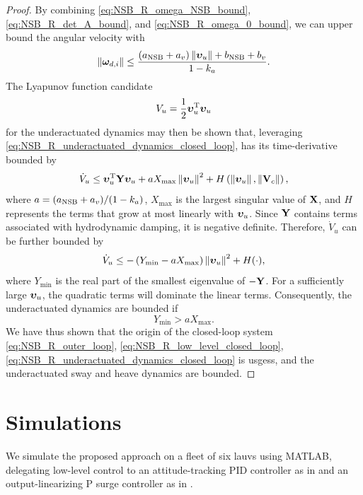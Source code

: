 \begin{proof}
    By combining \eqref{eq:NSB_R_omega_NSB_bound}, \eqref{eq:NSB_R_det_A_bound}, and \eqref{eq:NSB_R_omega_0_bound}, we can upper bound the angular velocity with 
    \begin{equation}
        \left\|\bm{\omega}_{d, i}\right\| \leq \frac{\left(a_{\rm NSB} + a_v\right)\left\|\bm{\upsilon}_u\right\| + b_{\rm NSB} + b_v}{1 - k_a} .
    \end{equation}
    The Lyapunov function candidate 
    \begin{equation}
        V_u = \frac{1}{2} \bm{\upsilon}_u^{\mathrm{T}}\bm{\upsilon}_u
    \end{equation}
    for the underactuated dynamics may then be shown that, leveraging \eqref{eq:NSB_R_underactuated_dynamics_closed_loop}, has its time-derivative bounded by 
    \begin{equation}
        \dot{V}_u \leq \bm{\upsilon}_u^{\mathrm{T}}\mathbf{Y}\bm{\upsilon}_u + aX_{\max}\left\|\bm{\upsilon}_u\right\|^2 + H\left(\left\|\bm{\upsilon}_u\right\|, \left\|\mathbf{V}_c\right\|\right),
    \end{equation}
    where $a = (a_{\rm NSB} + a_v)/(1 - k_a)$, $X_{\max}$ is the largest singular value of $\mathbf{X}$, and $H$ represents the terms that grow at most linearly with $\bm{\upsilon}_u$.
    Since $\mathbf{Y}$ contains terms associated with hydrodynamic damping, it is negative definite.
    Therefore, $\dot{V}_u$ can be further bounded by 
    \begin{equation}
        \dot{V}_u \leq -\left(Y_{\min} - aX_{\max}\right)\left\|\bm{\upsilon}_u\right\|^2 + H(\cdot),
    \end{equation}
    where $Y_{\min}$ is the real part of the smallest eigenvalue of $-\mathbf{Y}$.
    For a sufficiently large $\bm{\upsilon}_u$, the quadratic terms will dominate the linear terms.
    Consequently, the underactuated dynamics are bounded if 
    \begin{equation}
        Y_{\min} > aX_{\max}. \label{eq:NSB_R_boudedness_condition}
    \end{equation}
    We have thus shown that the origin of the closed-loop system \eqref{eq:NSB_R_outer_loop}, \eqref{eq:NSB_R_low_level_closed_loop}, \eqref{eq:NSB_R_underactuated_dynamics_closed_loop} is \glspl{usges}, and the underactuated sway and heave dynamics are bounded.
\end{proof}

\section{Simulations}
\label{sec:NSB_R_simulation}

We simulate the proposed approach on a fleet of six \glspl{lauv} \cite{sousa_LAUV_2012} using MATLAB, delegating low-level control to an attitude-tracking PID controller as in \cite{nakath_rigid_2017} and an output-linearizing P surge controller as in \cite{matouvs_formation_2022}.


